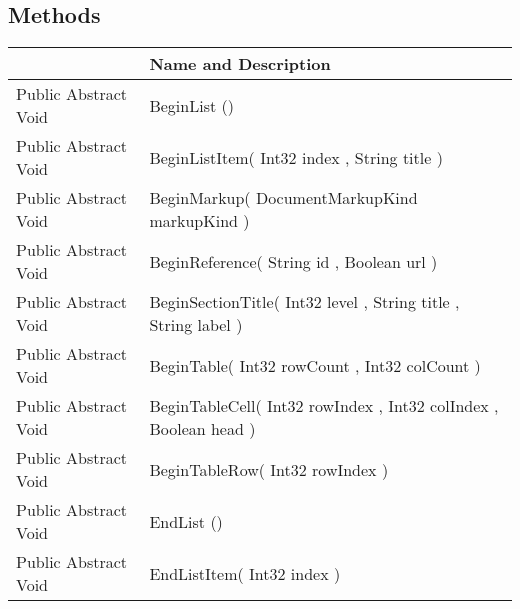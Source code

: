 \documentclass[11pt, oneside, a4paper]{book}
\begin{document}
\subsection{Methods}
\begin{center}
\begin{tabular}{| p{3cm} | p{12cm} | }
\hline
\textbf{ } & \textbf{ Name and Description}\\
\hline
 Public  Abstract  Void &  BeginList ()\hypertarget{SoftwareEngineeringTools.{}Documentation.{}IDocumentGenerator.{}BeginList}{}\\
\hline
 Public  Abstract  Void &  BeginListItem(\hypertarget{SoftwareEngineeringTools.{}Documentation.{}IDocumentGenerator.{}BeginListItem\_Int32\_String}{} Int32  index  ,  String  title  )\\
\hline
 Public  Abstract  Void &  BeginMarkup(\hypertarget{SoftwareEngineeringTools.{}Documentation.{}IDocumentGenerator.{}BeginMarkup\_DocumentMarkupKind}{} DocumentMarkupKind  markupKind  )\\
\hline
 Public  Abstract  Void &  BeginReference(\hypertarget{SoftwareEngineeringTools.{}Documentation.{}IDocumentGenerator.{}BeginReference\_String\_Boolean}{} String  id  ,  Boolean  url  )\\
\hline
 Public  Abstract  Void &  BeginSectionTitle(\hypertarget{SoftwareEngineeringTools.{}Documentation.{}IDocumentGenerator.{}BeginSectionTitle\_Int32\_String\_String}{} Int32  level  ,  String  title  ,  String  label  )\\
\hline
 Public  Abstract  Void &  BeginTable(\hypertarget{SoftwareEngineeringTools.{}Documentation.{}IDocumentGenerator.{}BeginTable\_Int32\_Int32}{} Int32  rowCount  ,  Int32  colCount  )\\
\hline
 Public  Abstract  Void &  BeginTableCell(\hypertarget{SoftwareEngineeringTools.{}Documentation.{}IDocumentGenerator.{}BeginTableCell\_Int32\_Int32\_Boolean}{} Int32  rowIndex  ,  Int32  colIndex  ,  Boolean  head  )\\
\hline
 Public  Abstract  Void &  BeginTableRow(\hypertarget{SoftwareEngineeringTools.{}Documentation.{}IDocumentGenerator.{}BeginTableRow\_Int32}{} Int32  rowIndex  )\\
\hline
 Public  Abstract  Void &  EndList ()\hypertarget{SoftwareEngineeringTools.{}Documentation.{}IDocumentGenerator.{}EndList}{}\\
\hline
 Public  Abstract  Void &  EndListItem(\hypertarget{SoftwareEngineeringTools.{}Documentation.{}IDocumentGenerator.{}EndListItem\_Int32}{} Int32  index  )\\

\end{tabular}
\end{center}
\end{document}
